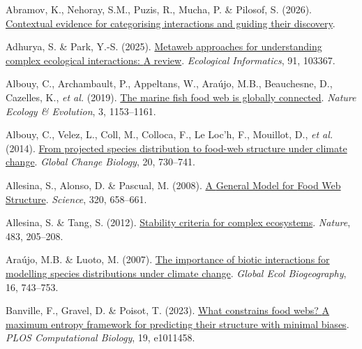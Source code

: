 \documentclass[
]{article}
\newlength{\cslhangindent}
\newenvironment{CSLReferences}[2] %
 {\begin{list}{}{%
  \setlength{\itemindent}{0pt}
  \setlength{\leftmargin}{0pt}
  \setlength{\parsep}{0pt}
  \ifodd #1
   \setlength{\leftmargin}{\cslhangindent}
   \setlength{\itemindent}{-1\cslhangindent}
  \fi
  \setlength{\itemsep}{#2\baselineskip}}}
 {\end{list}}
\begin{document}
\protect{}\label{refs}
\begin{CSLReferences}{1}{0}
Abramov, K., Nehoray, S.M., Puzis, R., Mucha, P. \& Pilosof, S. (2026).
\href{https://ecoevorxiv.org/repository/view/14484/}{Contextual evidence
for categorising interactions and guiding their discovery}.

Adhurya, S. \& Park, Y.-S. (2025).
\href{https://doi.org/10.1016/j.ecoinf.2025.103367}{Metaweb approaches
for understanding complex ecological interactions: {A} review}.
\emph{Ecological Informatics}, 91, 103367.

Albouy, C., Archambault, P., Appeltans, W., Araújo, M.B., Beauchesne,
D., Cazelles, K., \emph{et al.} (2019).
\href{https://doi.org/10.1038/s41559-019-0950-y}{The marine fish food
web is globally connected}. \emph{Nature Ecology \& Evolution}, 3,
1153--1161.

Albouy, C., Velez, L., Coll, M., Colloca, F., Le Loc'h, F., Mouillot,
D., \emph{et al.} (2014). \href{https://doi.org/10.1111/gcb.12467}{From
projected species distribution to food-web structure under climate
change}. \emph{Global Change Biology}, 20, 730--741.

Allesina, S., Alonso, D. \& Pascual, M. (2008).
\href{https://doi.org/10.1126/science.1156269}{A {General Model} for
{Food Web Structure}}. \emph{Science}, 320, 658--661.

Allesina, S. \& Tang, S. (2012).
\href{https://doi.org/10.1038/nature10832}{Stability criteria for
complex ecosystems}. \emph{Nature}, 483, 205--208.

Araújo, M.B. \& Luoto, M. (2007).
\href{https://doi.org/10.1111/j.1466-8238.2007.00359.x}{The importance
of biotic interactions for modelling species distributions under climate
change}. \emph{Global Ecol Biogeography}, 16, 743--753.

Banville, F., Gravel, D. \& Poisot, T. (2023).
\href{https://doi.org/10.1371/journal.pcbi.1011458}{What constrains food
webs? {A} maximum entropy framework for predicting their structure with
minimal biases}. \emph{PLOS Computational Biology}, 19, e1011458.


\end{CSLReferences}
\end{document}
